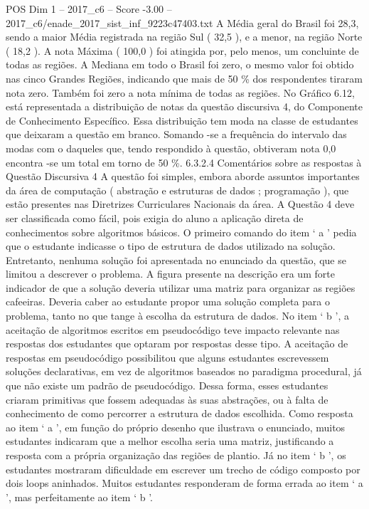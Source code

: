 \begin{textsample}{POS Dim 1 – 2017\_c6 – Score -3.00 – 2017\_c6/enade\_2017\_sist\_inf\_9223c47403.txt}
A Média geral do Brasil foi 28,3, sendo a maior Média registrada na região Sul ( 32,5 ), e a menor, na região Norte ( 18,2 ).
A nota Máxima ( 100,0 ) foi atingida por, pelo menos, um concluinte de todas as regiões.
A Mediana em todo o Brasil foi zero, o mesmo valor foi obtido nas cinco Grandes Regiões, indicando que mais de 50 \% dos respondentes tiraram nota zero.
Também foi zero a nota mínima de todas as regiões.
No Gráfico 6.12, está representada a distribuição de notas da questão discursiva 4, do Componente de Conhecimento Específico.
Essa distribuição tem moda na classe de estudantes que deixaram a questão em branco.
Somando -se a frequência do intervalo das modas com o daqueles que, tendo respondido à questão, obtiveram nota 0,0 encontra -se um total em torno de 50 \%. 6.3.2.4 Comentários sobre as respostas à Questão Discursiva 4 A questão foi simples, embora aborde assuntos importantes da área de computação ( abstração e estruturas de dados ; programação ), que estão presentes nas Diretrizes Curriculares Nacionais da área.
A Questão 4 deve ser classificada como fácil, pois exigia do aluno a aplicação direta de conhecimentos sobre algoritmos básicos.
O primeiro comando do item ‘ a ’ pedia que o estudante indicasse o tipo de estrutura de dados utilizado na solução.
Entretanto, nenhuma solução foi apresentada no enunciado da questão, que se limitou a descrever o problema.
A figura presente na descrição era um forte indicador de que a solução deveria utilizar uma matriz para organizar as regiões cafeeiras.
Deveria caber ao estudante propor uma solução completa para o problema, tanto no que tange à escolha da estrutura de dados.
No item ‘ b ’, a aceitação de algoritmos escritos em pseudocódigo teve impacto relevante nas respostas dos estudantes que optaram por respostas desse tipo.
A aceitação de respostas em pseudocódigo possibilitou que alguns estudantes escrevessem soluções declarativas, em vez de algoritmos baseados no paradigma procedural, já que não existe um padrão de pseudocódigo.
Dessa forma, esses estudantes criaram primitivas que fossem adequadas às suas abstrações, ou à falta de conhecimento de como percorrer a estrutura de dados escolhida.
Como resposta ao item ‘ a ’, em função do próprio desenho que ilustrava o enunciado, muitos estudantes indicaram que a melhor escolha seria uma matriz, justificando a resposta com a própria organização das regiões de plantio.
Já no item ‘ b ’, os estudantes mostraram dificuldade em escrever um trecho de código composto por dois loops aninhados.
Muitos estudantes responderam de forma errada ao item ‘ a ’, mas perfeitamente ao item ‘ b ’.

\end{textsample}
